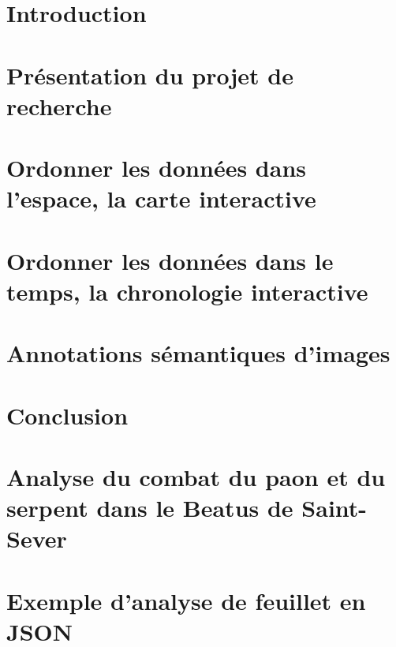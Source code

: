 \documentclass[a4paper,12pt,twoside]{book}
\begin{document}
	\chapter{Introduction}
	
	\newpage{\pagestyle{empty}\cleardoublepage}
	
	\mainmatter	
	
	\chapter{Présentation du projet de recherche }
	
	
	\chapter{Ordonner les données dans l'espace, la carte interactive}
	
	
	\chapter{Ordonner les données dans le temps, la chronologie interactive}
	
	
	\chapter{Annotations sémantiques d'images}
	
	\cleardoublepage
		
	\chapter*{Conclusion}
	
	\newpage{\pagestyle{empty}\cleardoublepage}
	
	\appendix
	
	\chapter[Analyse du Beatus]{Analyse du combat du paon et du serpent dans le Beatus de Saint-Sever}
	
	\chapter[Analyse en JSON]{Exemple d’analyse de feuillet en JSON}
	
\end{document}
